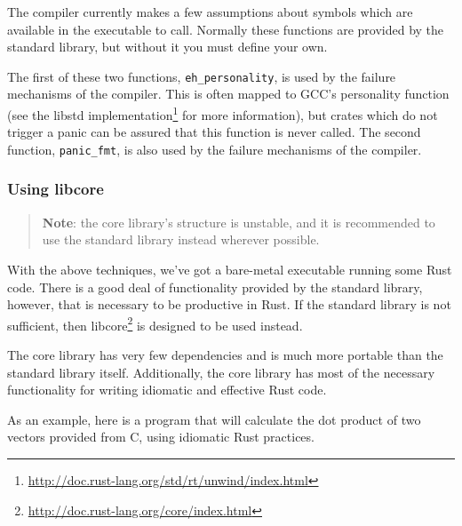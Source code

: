 \documentclass[a4paper,]{book}
\renewcommand{\href}[2]{#2\footnote{\url{#1}}}
\begin{document}
The compiler currently makes a few assumptions about symbols which are
available in the executable to call. Normally these functions are
provided by the standard library, but without it you must define your
own.

The first of these two functions, \texttt{eh\_personality}, is used by
the failure mechanisms of the compiler. This is often mapped to GCC's
personality function (see the
\href{http://doc.rust-lang.org/std/rt/unwind/index.html}{libstd
implementation} for more information), but crates which do not trigger a
panic can be assured that this function is never called. The second
function, \texttt{panic\_fmt}, is also used by the failure mechanisms of
the compiler.

\subsubsection{Using libcore}\label{using-libcore}

\begin{quote}
\textbf{Note}: the core library's structure is unstable, and it is
recommended to use the standard library instead wherever possible.
\end{quote}

With the above techniques, we've got a bare-metal executable running
some Rust code. There is a good deal of functionality provided by the
standard library, however, that is necessary to be productive in Rust.
If the standard library is not sufficient, then
\href{http://doc.rust-lang.org/core/index.html}{libcore} is designed to
be used instead.

The core library has very few dependencies and is much more portable
than the standard library itself. Additionally, the core library has
most of the necessary functionality for writing idiomatic and effective
Rust code.

As an example, here is a program that will calculate the dot product of
two vectors provided from C, using idiomatic Rust practices.
\end{document}
